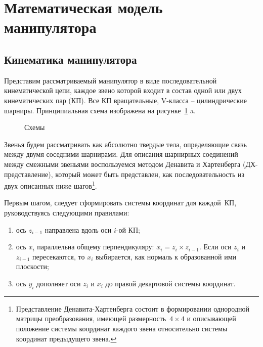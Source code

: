 \section{Математическая модель манипулятора}\label{part_math_model_of_robot}

\subsection{Кинематика манипулятора}\label{part_kinematics}


Представим рассматриваемый манипулятор в виде последовательной кинематической цепи, каждое звено которой входит в состав одной или двух кинематических пар (КП). Все КП вращательные, V-класса -- цилиндрические шарниры. Принципиальная схема изображена на рисунке~\ref{img:kinematics} a.

\begin{figure}[h!]
	\begin{minipage}[h]{0.5\linewidth}
	\end{minipage}
	\hfill
	\begin{minipage}[h]{0.5\linewidth}
	\end{minipage}
	\caption{Схемы}
	\label{img:kinematics}
\end{figure}

Звенья будем рассматривать как абсолютно твердые тела, определяющие связь между двумя соседними шарнирами. Для описания шарнирных соединений между смежными звеньями воспользуемся методом Денавита и Хартенберга (ДХ-представление), который может быть представлен, как последовательность из двух описанных ниже шагов\footnote{Представление Денавита-Хартенберга состоит в формировании однородной матрицы преобразования, имеющей размерность~$4 \times 4$ и описывающей положение системы координат каждого звена относительно системы координат предыдущего звена.}.


Первым шагом, следует сформировать системы координат для каждой~КП, руководствуясь следующими правилами:

\begin{enumerate}
	\item ось $z_{i-1}$ направлена вдоль оси $i$-ой КП;
	\item ось $x_i$ параллельна общему перпендикуляру: $x_i = z_i \times z_{i-1}$. Если оси $z_i$ и $z_{i-1}$ пересекаются, то $x_i$ выбирается, как нормаль к образованной ими плоскости;
	
	\item ось $y_i$ дополняет оси $z_i$ и $x_i$ до правой декартовой системы координат. 
\end{enumerate}


